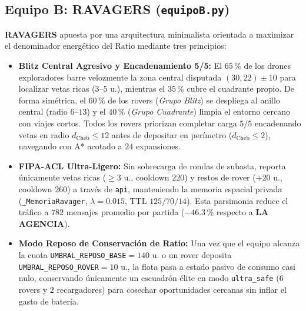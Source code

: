 \documentclass[10pt,a4paper]{article}
\begin{document}
\subsection{Equipo B: RAVAGERS (\texttt{equipoB.py})}
\textbf{RAVAGERS} apuesta por una arquitectura minimalista orientada a maximizar el denominador energético del $\text{Ratio}$ mediante tres principios:
\begin{itemize}
  \item \textbf{Blitz Central Agresivo y Encadenamiento 5/5:} El $65\,\%$ de los drones exploradores barre velozmente la zona central disputada $(30,22)\pm 10$ para localizar vetas ricas ($3\text{--}5\text{ u.}$), mientras el $35\,\%$ cubre el cuadrante propio. De forma simétrica, el $60\,\%$ de los rovers (\emph{Grupo Blitz}) se despliega al anillo central (radio $6\text{--}13$) y el $40\,\%$ (\emph{Grupo Cuadrante}) limpia el entorno cercano con viajes cortos. Todos los rovers priorizan completar carga $5/5$ encadenando vetas en radio $d_{\text{Cheb}}\le 12$ antes de depositar en perímetro ($d_{\text{Cheb}}\le 2$), navegando con A* acotado a $24$ expansiones.
  \item \textbf{FIPA-ACL Ultra-Ligero:} Sin sobrecarga de rondas de subasta, reporta únicamente vetas ricas ($\ge 3\text{ u.}$, cooldown $220$) y restos de rover ($+20\text{ u.}$, cooldown $260$) a través de \texttt{api}, manteniendo la memoria espacial privada (\texttt{\_MemoriaRavager}, $\lambda=0.015$, TTL $125/70/14$). Esta parsimonia reduce el tráfico a $782$ mensajes promedio por partida ($-46.3\,\%$ respecto a \textbf{LA AGENCIA}).
  \item \textbf{Modo Reposo de Conservación de Ratio:} Una vez que el equipo alcanza la cuota \texttt{UMBRAL\_REPOSO\_BASE}$=140\text{ u.}$ o un rover deposita \texttt{UMBRAL\_REPOSO\_ROVER}$=10\text{ u.}$, la flota pasa a estado pasivo de consumo casi nulo, conservando únicamente un escuadrón élite en modo \texttt{ultra\_safe} ($6$ rovers y $2$ recargadores) para cosechar oportunidades cercanas sin inflar el gasto de batería.
\end{itemize}
\end{document}
